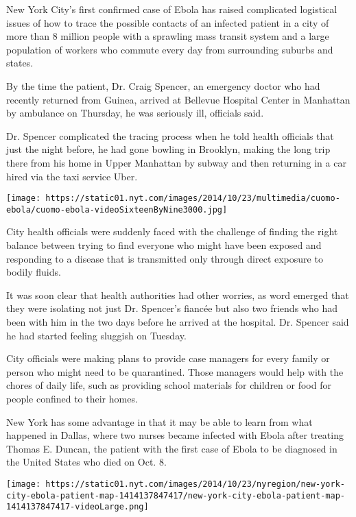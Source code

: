 New York City's first confirmed case of Ebola has raised complicated
logistical issues of how to trace the possible contacts of an infected
patient in a city of more than 8 million people with a sprawling mass
transit system and a large population of workers who commute every day
from surrounding suburbs and states.

By the time the patient, Dr. Craig Spencer, an emergency doctor who had
recently returned from Guinea, arrived at Bellevue Hospital Center in
Manhattan by ambulance on Thursday, he was seriously ill, officials
said.

Dr. Spencer complicated the tracing process when he told health
officials that just the night before, he had gone bowling in Brooklyn,
making the long trip there from his home in Upper Manhattan by subway
and then returning in a car hired via the taxi service Uber.

\texttt{[image: https://static01.nyt.com/images/2014/10/23/multimedia/cuomo-ebola/cuomo-ebola-videoSixteenByNine3000.jpg]}

City health officials were suddenly faced with the challenge of finding
the right balance between trying to find everyone who might have been
exposed and responding to a disease that is transmitted only through
direct exposure to bodily fluids.

It was soon clear that health authorities had other worries, as word
emerged that they were isolating not just Dr. Spencer's fiancée but also
two friends who had been with him in the two days before he arrived at
the hospital. Dr. Spencer said he had started feeling sluggish on
Tuesday.

City officials were making plans to provide case managers for every
family or person who might need to be quarantined. Those managers would
help with the chores of daily life, such as providing school materials
for children or food for people confined to their homes.

New York has some advantage in that it may be able to learn from what
happened in Dallas, where two nurses became infected with Ebola after
treating Thomas E. Duncan, the patient with the first case of Ebola to
be diagnosed in the United States who died on Oct. 8.

\href{https://www.nytimes.com/interactive/2014/10/23/nyregion/new-york-city-ebola-patient-timeline-map.html}{}

\texttt{[image: https://static01.nyt.com/images/2014/10/23/nyregion/new-york-city-ebola-patient-map-1414137847417/new-york-city-ebola-patient-map-1414137847417-videoLarge.png]}

